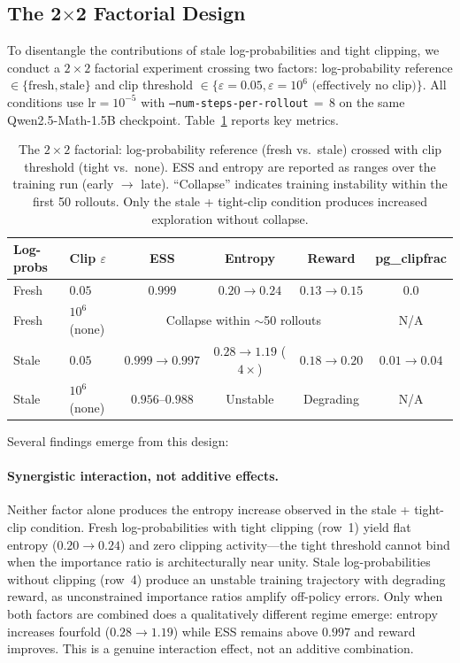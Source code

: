 \subsection{The 2$\times$2 Factorial Design}
\label{sec:factorial}

To disentangle the contributions of stale log-probabilities and tight clipping, we conduct a $2 \times 2$ factorial experiment crossing two factors: log-probability reference $\in \{\text{fresh}, \text{stale}\}$ and clip threshold $\in \{\varepsilon = 0.05, \varepsilon = 10^6 \text{ (effectively no clip)}\}$.
All conditions use $\text{lr} = 10^{-5}$ with \texttt{--num-steps-per-rollout}$\,{=}\,8$ on the same Qwen2.5-Math-1.5B checkpoint.
Table~\ref{tab:factorial} reports key metrics.

\begin{table}[t]
\centering
\caption{The $2 \times 2$ factorial: log-probability reference (fresh vs.\ stale) crossed with clip threshold (tight vs.\ none).
ESS and entropy are reported as ranges over the training run (early $\to$ late).
``Collapse'' indicates training instability within the first 50 rollouts.
Only the stale + tight-clip condition produces increased exploration without collapse.}
\label{tab:factorial}
\small
\begin{tabular}{@{}llcccc@{}}
\toprule
\textbf{Log-probs} & \textbf{Clip $\varepsilon$} & \textbf{ESS} & \textbf{Entropy} & \textbf{Reward} & \textbf{pg\_clipfrac} \\
\midrule
Fresh & $0.05$ & $0.999$ & $0.20 \to 0.24$ & $0.13 \to 0.15$ & $0.0$ \\
Fresh & $10^6$ (none) & \multicolumn{3}{c}{Collapse within $\sim$50 rollouts} & N/A \\
Stale & $0.05$ & $0.999 \to 0.997$ & $0.28 \to 1.19$ ($4\times$) & $0.18 \to 0.20$ & $0.01 \to 0.04$ \\
Stale & $10^6$ (none) & $0.956$--$0.988$ & Unstable & Degrading & N/A \\
\bottomrule
\end{tabular}
\end{table}

Several findings emerge from this design:

\paragraph{Synergistic interaction, not additive effects.}
Neither factor alone produces the entropy increase observed in the stale + tight-clip condition.
Fresh log-probabilities with tight clipping (row~1) yield flat entropy ($0.20 \to 0.24$) and zero clipping activity---the tight threshold cannot bind when the importance ratio is architecturally near unity.
Stale log-probabilities without clipping (row~4) produce an unstable training trajectory with degrading reward, as unconstrained importance ratios amplify off-policy errors.
Only when both factors are combined does a qualitatively different regime emerge: entropy increases fourfold ($0.28 \to 1.19$) while ESS remains above $0.997$ and reward improves.
This is a genuine interaction effect, not an additive combination.

